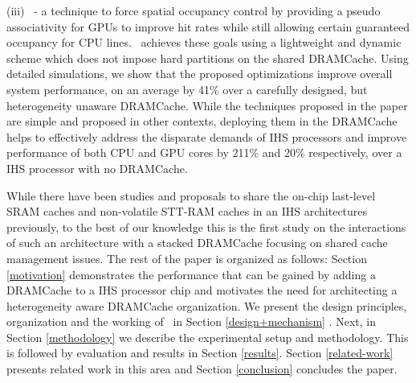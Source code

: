(iii) \chaining\ - a technique to force spatial occupancy control by providing a pseudo associativity for GPUs to improve hit rates while still allowing certain guaranteed occupancy for CPU lines. \cachename\ achieves these goals using a lightweight and dynamic scheme which does not impose hard partitions on the shared DRAMCache. Using detailed simulations, we show that the proposed optimizations improve overall system performance, on an average by 41\% over a carefully designed, but heterogeneity unaware DRAMCache.
While the techniques proposed in the paper are simple and proposed in other contexts, deploying them in the DRAMCache helps to effectively address the disparate demands of IHS processors and improve performance of both CPU and GPU cores by 211\% and 20\% respectively, over a IHS processor with no DRAMCache.

\par While there have been studies and proposals to share the on-chip last-level SRAM caches \cite{helm,tap} and non-volatile STT-RAM caches \cite{oscar} in an IHS architectures previously, to the best of our knowledge this is the first study on the interactions of such an architecture with a stacked DRAMCache focusing on shared cache management issues.
The rest of the paper is organized as follows: Section \ref{motivation} demonstrates the performance that can be gained by adding a DRAMCache to a IHS processor chip and motivates the need for architecting a heterogeneity aware DRAMCache organization. We present the design principles, organization and the working of \cachename\ in Section \ref{design+mechanism} . Next, in Section \ref{methodology} we describe the experimental setup and methodology. This is followed by evaluation and results in Section \ref{results}. Section \ref{related-work} presents related work in this area and Section \ref{conclusion} concludes the paper.
